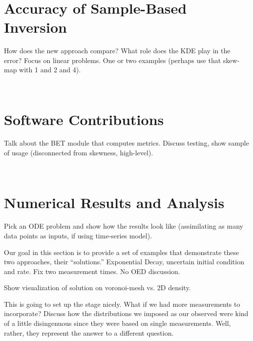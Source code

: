 \
\section{Accuracy of Sample-Based Inversion}

How does the new approach compare? What role does the KDE play in the error?
Focus on linear problems. One or two examples (perhaps use that skew-map with 1 and 2 and 4).

\
\section{Software Contributions}

Talk about the BET module that computes metrics.
Discuss testing, show sample of usage (disconnected from skewness, high-level).

\
\section{Numerical Results and Analysis}

Pick an ODE problem and show how the results look like (assimilating as many data points as inputs, if using time-series model). 

Our goal in this section is to provide a set of examples that demonstrate these two approaches, their ``solutions.''
Exponential Decay, uncertain initial condition and rate. Fix two measurement times. No OED discussion.

Show visualization of solution on voronoi-mesh vs. 2D density. 

This is going to set up the stage nicely.
What if we had more measurements to incorporate? Discuss how the distributions we imposed as our observed were kind of a little disingenuous since they were based on single measurements. Well, rather, they represent the answer to a different question.


